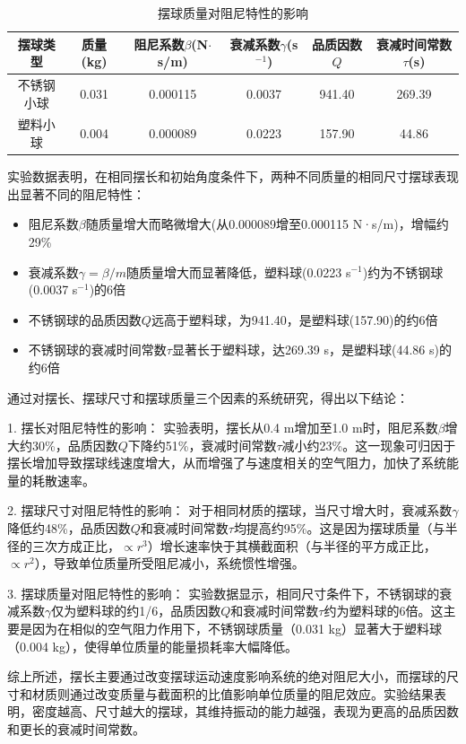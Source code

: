 \begin{table}[H]
\centering
\caption{摆球质量对阻尼特性的影响}
\begin{tabular}{@{}c c c c c c@{}}
\toprule
\textbf{摆球类型} & \textbf{质量(kg)} & \textbf{阻尼系数$\beta$(N$\cdot$s/m)} & \textbf{衰减系数$\gamma$(s$^{-1}$)} & \textbf{品质因数$Q$} & \textbf{衰减时间常数$\tau$(s)} \\
\midrule
不锈钢小球 & 0.031 & 0.000115 & 0.0037 & 941.40 & 269.39 \\
塑料小球 & 0.004 & 0.000089 & 0.0223 & 157.90 & 44.86 \\
\bottomrule
\end{tabular}
\label{tab:material_damping}
\end{table}

实验数据表明，在相同摆长和初始角度条件下，两种不同质量的相同尺寸摆球表现出显著不同的阻尼特性：
\begin{itemize}
  \item 阻尼系数$\beta$随质量增大而略微增大(从0.000089增至0.000115 N·s/m)，增幅约29\%
  \item 衰减系数$\gamma=\beta/m$随质量增大而显著降低，塑料球(0.0223 s$^{-1}$)约为不锈钢球(0.0037 s$^{-1}$)的6倍
  \item 不锈钢球的品质因数$Q$远高于塑料球，为941.40，是塑料球(157.90)的约6倍
  \item 不锈钢球的衰减时间常数$\tau$显著长于塑料球，达269.39 s，是塑料球(44.86 s)的约6倍
\end{itemize}

通过对摆长、摆球尺寸和摆球质量三个因素的系统研究，得出以下结论：
\begin{SecondaryBox}[阻尼特性影响因素分析]

1. 摆长对阻尼特性的影响：
   实验表明，摆长从0.4 m增加至1.0 m时，阻尼系数$\beta$增大约30\%，品质因数$Q$下降约51\%，衰减时间常数$\tau$减小约23\%。这一现象可归因于摆长增加导致摆球线速度增大，从而增强了与速度相关的空气阻力，加快了系统能量的耗散速率。

2. 摆球尺寸对阻尼特性的影响：
   对于相同材质的摆球，当尺寸增大时，衰减系数$\gamma$降低约48\%，品质因数$Q$和衰减时间常数$\tau$均提高约95\%。这是因为摆球质量（与半径的三次方成正比，$\propto r^3$）增长速率快于其横截面积（与半径的平方成正比，$\propto r^2$），导致单位质量所受阻尼减小，系统惯性增强。

3. 摆球质量对阻尼特性的影响：
   实验数据显示，相同尺寸条件下，不锈钢球的衰减系数$\gamma$仅为塑料球的约1/6，品质因数$Q$和衰减时间常数$\tau$约为塑料球的6倍。这主要是因为在相似的空气阻力作用下，不锈钢球质量（0.031 kg）显著大于塑料球（0.004 kg），使得单位质量的能量损耗率大幅降低。

\quad\quad 综上所述，摆长主要通过改变摆球运动速度影响系统的绝对阻尼大小，而摆球的尺寸和材质则通过改变质量与截面积的比值影响单位质量的阻尼效应。实验结果表明，密度越高、尺寸越大的摆球，其维持振动的能力越强，表现为更高的品质因数和更长的衰减时间常数。
\end{SecondaryBox}